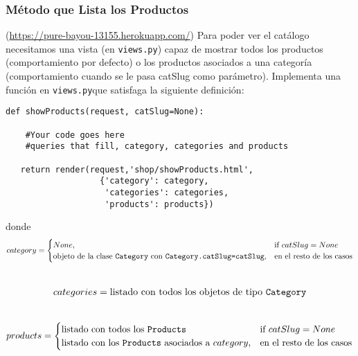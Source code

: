 \documentclass[12pt]{article} %
\newcommand{\herokuurl}[1]{\url{https://pure-bayou-13155.herokuapp.com/#1}}%
\newcommand{\views}{\texttt{views.py}}%
\begin{document}

\subsubsection{Método que Lista los Productos}(\herokuurl{})
Para poder ver el catálogo necesitamos una vista (en \texttt{views.py}) capaz de mostrar todos los productos (comportamiento por defecto) o  los productos asociados a una categoría (comportamiento cuando se le pasa catSlug como parámetro). Implementa una función en \views que satisfaga la siguiente definición:

\begin{verbatim}
def showProducts(request, catSlug=None):
   
    #Your code goes here
    #queries that fill, category, categories and products
   
   return render(request,'shop/showProducts.html', 
                   {'category': category,
                    'categories': categories,
                    'products': products})

\end{verbatim}
donde\\

\begin{equation}
    category=
    \begin{cases}
      None, & \text{if}\ catSlug=None \\
      \text{objeto de la clase \texttt{Category} con \texttt{Category.catSlug=catSlug}}, & \text{en el resto de los casos}
    \end{cases}
\end{equation}\\
\begin{equation}
    categories = \text{listado con todos los objetos de tipo \texttt{Category}}
\end{equation}\\
\begin{equation}
    products=
    \begin{cases}
      \text{listado con todos los \texttt{Products}} & \text{if}\ catSlug=None \\
      \text{listado con los \texttt{Products} asociados a } category, & \text{en el resto de los casos}
    \end{cases}
\end{equation}\\
  
\end{document}
